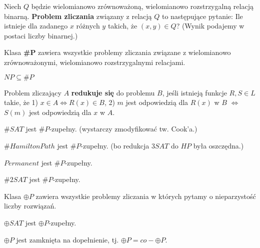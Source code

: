 \begin{definicja}
    Niech $Q$ będzie wielomianowo zrównoważoną, wielomianowo rozstrzygalną relacją binarną. 
    \textbf{Problem zliczania} związany z relacją $Q$ to następujące pytanie:
    Ile istnieje dla zadanego $x$ różnych $y$ takich, że $(x,y)\in Q$?
    (Wynik podajemy w postaci liczby binarnej.)
\end{definicja}

\begin{definicja}
    Klasa \textbf{\#P} zawiera wszystkie problemy zliczania związane z wielomianowo zrównoważonymi, wielomianowo rozstrzygalnymi relacjami.
\end{definicja}

\begin{twierdzenie}
    $NP\subseteq \#P$
\end{twierdzenie}

\begin{definicja}
    Problem zliczający $A$ \textbf{redukuje się} do problemu $B$, jeśli istnieją funkcje $R,S\in L$ takie, że
    1) $x\in A \iff R(x)\in B$,
    2) $m$ jest odpowiedzią dla $R(x)$ w $B$ $\iff$ $S(m)$ jest odpowiedzią dla $x$ w $A$.
\end{definicja}

\begin{twierdzenie}
    $\#SAT$ jest $\#P$-zupełny. (wystarczy zmodyfikować tw. Cook'a.)
\end{twierdzenie}

\begin{twierdzenie}
    $\#HamiltonPath$ jest $\#P$-zupełny. (bo redukcja $3SAT$ do $HP$ była oszczędna.)
\end{twierdzenie}

\begin{twierdzenie}
    $Permanent$ jest $\#P$-zupełny.
\end{twierdzenie}

\begin{twierdzenie}
    $\#2SAT$ jest $\#P$-zupełny.
\end{twierdzenie}

\begin{definicja}
    Klasa $\oplus P$ zawiera wszystkie problemy zliczania w których pytamy o nieparzystość liczby rozwiązań.
\end{definicja}

\begin{twierdzenie}
    $\oplus SAT$ jest $\oplus P$-zupełny.
\end{twierdzenie}

\begin{lemat}
    $\oplus P$ jest zamknięta na dopełnienie, tj. $\oplus P = co-\oplus P$.
\end{lemat}


